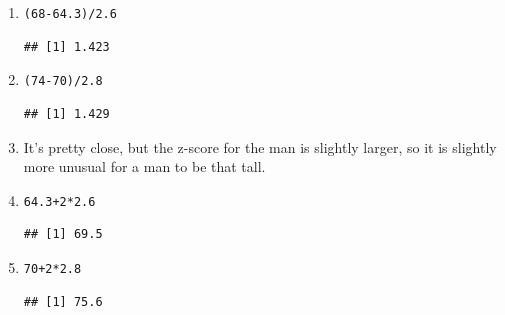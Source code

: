 \documentclass[twoside]{book}\usepackage[]{graphicx}\usepackage[]{xcolor}
\makeatletter
\newcommand{\hlnum}[1]{\textcolor[rgb]{0.686,0.059,0.569}{#1}}%
\newcommand{\hlopt}[1]{\textcolor[rgb]{0,0,0}{#1}}%
\newcommand{\hlstd}[1]{\textcolor[rgb]{0.345,0.345,0.345}{#1}}%
\newenvironment{kframe}{%
 \def\at@end@of@kframe{}%
 \ifinner\ifhmode%
  \def\at@end@of@kframe{\end{minipage}}%
  \begin{minipage}{\columnwidth}%
 \fi\fi%
 \def\FrameCommand##1{\hskip\@totalleftmargin \hskip-\fboxsep
 \colorbox{shadecolor}{##1}\hskip-\fboxsep
     \hskip-\linewidth \hskip-\@totalleftmargin \hskip\columnwidth}%
 \MakeFramed {\advance\hsize-\width
   \@totalleftmargin\z@ \linewidth\hsize
   \@setminipage}}%
 {\par\unskip\endMakeFramed%
 \at@end@of@kframe}
\newenvironment{knitrout}{}{} %
\makeatother
\begin{document}
\begin{solution}
\begin{enumerate}
\item
\begin{knitrout}
\color{fgcolor}\begin{kframe}
\begin{alltt}
\hlstd{(}\hlnum{68} \hlopt{-} \hlnum{64.3}\hlstd{)}\hlopt{/}\hlnum{2.6}
\end{alltt}
\begin{verbatim}
## [1] 1.423
\end{verbatim}
\end{kframe}
\end{knitrout}

\item
\begin{knitrout}
\color{fgcolor}\begin{kframe}
\begin{alltt}
\hlstd{(}\hlnum{74} \hlopt{-} \hlnum{70}\hlstd{)} \hlopt{/} \hlnum{2.8}
\end{alltt}
\begin{verbatim}
## [1] 1.429
\end{verbatim}
\end{kframe}
\end{knitrout}

\item
It's pretty close, but the z-score for the man is slightly
larger, so it is slightly more unusual for a man to be that tall.

\item
\begin{knitrout}
\color{fgcolor}\begin{kframe}
\begin{alltt}
\hlnum{64.3} \hlopt{+} \hlnum{2} \hlopt{*} \hlnum{2.6}
\end{alltt}
\begin{verbatim}
## [1] 69.5
\end{verbatim}
\end{kframe}
\end{knitrout}

\item
\begin{knitrout}
\color{fgcolor}\begin{kframe}
\begin{alltt}
\hlnum{70} \hlopt{+} \hlnum{2} \hlopt{*} \hlnum{2.8}
\end{alltt}
\begin{verbatim}
## [1] 75.6
\end{verbatim}
\end{kframe}
\end{knitrout}
\end{enumerate}
\end{solution}
\end{document}
